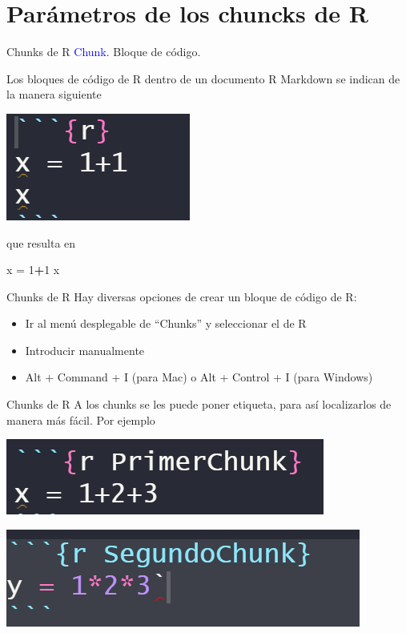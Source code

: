 \documentclass[
  ignorenonframetext,
]{beamer}
\newenvironment{Shaded}{\begin{snugshade}}{\end{snugshade}}
\newcommand{\DecValTok}[1]{\textcolor[rgb]{0.00,0.00,0.81}{#1}}
\newcommand{\NormalTok}[1]{#1}
\newcommand{\OtherTok}[1]{\textcolor[rgb]{0.56,0.35,0.01}{#1}}
\newcommand{\SpecialCharTok}[1]{\textcolor[rgb]{0.81,0.36,0.00}{\textbf{#1}}}
\providecommand{\tightlist}{%
  \setlength{\itemsep}{0pt}\setlength{\parskip}{0pt}}
\newcommand\blue[1]{\textcolor{blue}{#1}}
\begin{document}
\section{Parámetros de los chuncks de
R}\label{paruxe1metros-de-los-chuncks-de-r}

\begin{frame}[fragile]{Chunks de R}
\label{chunks-de-r}
\blue{Chunk.} Bloque de código.

Los bloques de código de R dentro de un documento R Markdown se indican
de la manera siguiente

\includegraphics[width=0.15\linewidth]{Imgs/chunk_00}

que resulta en

\begin{Shaded}
\begin{Highlighting}[]
\NormalTok{x }\OtherTok{=} \DecValTok{1}\SpecialCharTok{+}\DecValTok{1}
\NormalTok{x}
\end{Highlighting}
\end{Shaded}
\end{frame}

\begin{frame}{Chunks de R}
\label{chunks-de-r-1}
Hay diversas opciones de crear un bloque de código de R:

\begin{itemize}
\tightlist
\item
  Ir al menú desplegable de ``Chunks'' y seleccionar el de R
\item
  Introducir manualmente
\item
  Alt + Command + I (para Mac) o Alt + Control + I (para Windows)
\end{itemize}
\end{frame}

\begin{frame}{Chunks de R}
\label{chunks-de-r-2}
A los chunks se les puede poner etiqueta, para así localizarlos de
manera más fácil. Por ejemplo

\includegraphics[width=0.6\linewidth]{Imgs/primer_chunk}

\includegraphics[width=0.6\linewidth]{Imgs/segundo_chunk}
\end{frame}
\end{document}
